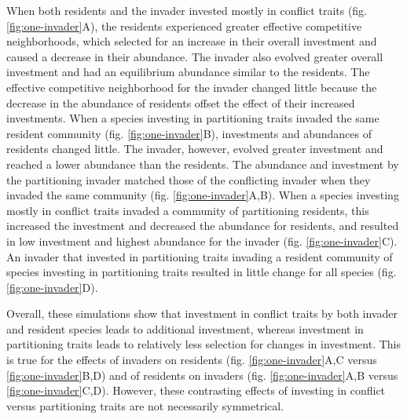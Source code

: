 When both residents and the invader invested mostly in conflict traits
(fig. \ref{fig:one-invader}A), the residents experienced greater effective competitive
neighborhoods, which selected for an increase in their overall
investment and caused a decrease in their abundance. The invader also
evolved greater overall investment and had an equilibrium abundance
similar to the residents. The effective competitive neighborhood for the
invader changed little because the decrease in the abundance of
residents offset the effect of their increased investments. When a
species investing in partitioning traits invaded the same resident
community (fig. \ref{fig:one-invader}B), investments and abundances of residents changed
little. The invader, however, evolved greater investment and reached a
lower abundance than the residents. The abundance and investment by the
partitioning invader matched those of the conflicting invader when they
invaded the same community (fig. \ref{fig:one-invader}A,B). When a species investing mostly
in conflict traits invaded a community of partitioning residents, this
increased the investment and decreased the abundance for residents, and
resulted in low investment and highest abundance for the invader (fig.
\ref{fig:one-invader}C). An invader that invested in partitioning traits invading a resident
community of species investing in partitioning traits resulted in little
change for all species (fig. \ref{fig:one-invader}D).

Overall, these simulations show that investment in conflict traits by
both invader and resident species leads to additional investment,
whereas investment in partitioning traits leads to relatively less
selection for changes in investment. This is true for the effects of
invaders on residents (fig. \ref{fig:one-invader}A,C versus \ref{fig:one-invader}B,D) and of residents on
invaders (fig. \ref{fig:one-invader}A,B versus \ref{fig:one-invader}C,D). However, these contrasting effects of
investing in conflict versus partitioning traits are not necessarily
symmetrical.

